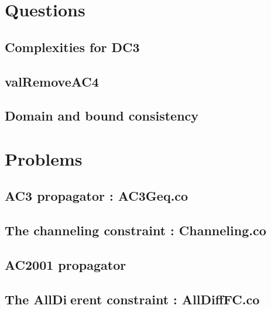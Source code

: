 \documentclass{eplDoc}
\begin{document}
\maketitle
\newpage

\section{Questions}
\subsection{ Complexities for DC3}

\subsection{ valRemoveAC4}

\subsection{ Domain and bound consistency}

\section{Problems}

\subsection{AC3 propagator : AC3Geq.co}

\subsection{The channeling constraint : Channeling.co}

\subsection{AC2001 propagator}

\subsection{The AllDierent constraint : AllDiffFC.co}
\end{document}
